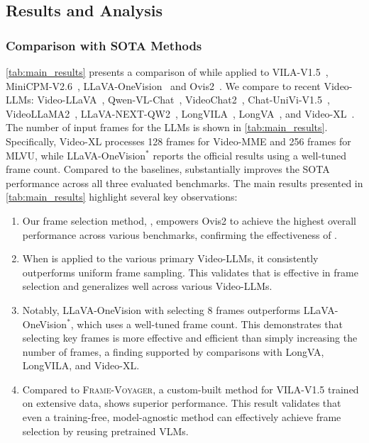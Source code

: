 \subsection{Results and Analysis}


\subsubsection{Comparison with SOTA Methods} 

\cref{tab:main_results} presents a comparison of \mname{} while applied to VILA-V1.5~\cite{lin2024vila},
MiniCPM-V2.6~\cite{yao2024minicpm}, LLaVA-OneVision~\cite{li2024llava} and Ovis2~\cite{ovis2}.
We compare \mname{} to recent Video-LLMs:
Video-LLaVA~\cite{lin2023video}, Qwen-VL-Chat~\cite{bai2023qwen}, VideoChat2~\cite{li2023videochat}, Chat-UniVi-V1.5~\cite{jin2024chat}, VideoLLaMA2~\cite{cheng2024videollama2}, LLaVA-NEXT-QW2~\cite{liu2024llavanext}, LongVILA~\cite{xue2024longvila}, LongVA~\cite{zhang2024longva}, and Video-XL~\cite{shu2024video}. 
%
The number of input frames for the LLMs is shown in \cref{tab:main_results}. 
Specifically, Video-XL processes 128 frames for Video-MME and 256 frames for MLVU, while LLaVA-OneVision$^*$ reports the official results using a well-tuned frame count.	
%
% 
Compared to the baselines, \mname{} substantially improves the SOTA performance across all three evaluated benchmarks.
The main results presented in \cref{tab:main_results} highlight several key observations:
\begin{enumerate}
	\item Our frame selection method, \mname{}, empowers Ovis2 to achieve the highest overall performance across various benchmarks, confirming the effectiveness of \mname{}.
	\item When \mname{} is applied to the various primary Video-LLMs,
		it consistently outperforms uniform frame sampling.
		This validates that \mname{} is effective in frame selection and generalizes well across various Video-LLMs.
	\item Notably, LLaVA-OneVision with \mname{} selecting 8 frames outperforms LLaVA-OneVision$^*$, which uses a well-tuned frame count.
		This demonstrates that selecting key frames is more effective and efficient than simply increasing the number of frames, a finding supported by comparisons with LongVA, LongVILA, and Video-XL.
	\item Compared to \textsc{Frame-Voyager}, a custom-built method for VILA-V1.5 trained on extensive data, \mname{} shows superior performance. 
	This result validates that even a training-free, model-agnostic method can effectively achieve frame selection by reusing pretrained VLMs.
\end{enumerate}


